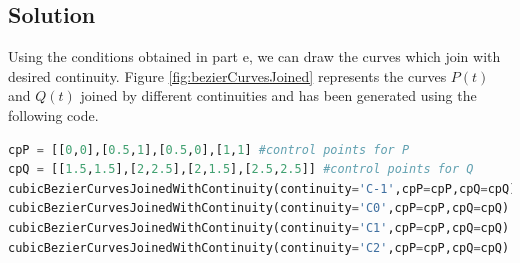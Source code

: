 \documentclass[a4paper, 11pt]{article}
\begin{document}
\begin{enumerate}
\begin{enumerate}[label=\alph*.]
    \subsection*{Solution}
    Using the conditions obtained in part e, we can draw the curves which join with desired continuity. Figure \ref{fig:bezierCurvesJoined} represents the curves \(P(t)\) and \(Q(t)\) joined by different continuities and has been generated using the following code.
    \begin{lstlisting}[language=Python]
cpP = [[0,0],[0.5,1],[0.5,0],[1,1] #control points for P
cpQ = [[1.5,1.5],[2,2.5],[2,1.5],[2.5,2.5]] #control points for Q
cubicBezierCurvesJoinedWithContinuity(continuity='C-1',cpP=cpP,cpQ=cpQ) 
cubicBezierCurvesJoinedWithContinuity(continuity='C0',cpP=cpP,cpQ=cpQ)
cubicBezierCurvesJoinedWithContinuity(continuity='C1',cpP=cpP,cpQ=cpQ)
cubicBezierCurvesJoinedWithContinuity(continuity='C2',cpP=cpP,cpQ=cpQ)
\end{lstlisting} 
    \begin{figure}[ht] 
 \quad 
\end{figure}
\end{enumerate}
\end{enumerate}
\end{document}
